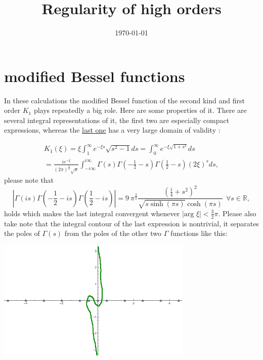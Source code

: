\documentclass[a4paper,11pt]{article}
\begin{document}
\title{Regularity of high orders}


\date{\today}



\maketitle

\section{modified Bessel functions}

In these calculations the modified Bessel function of the second kind and first order \(K_1\) plays repeatedly a big role. 
Here are some properties of it. There are several integral representations of it, the first two are especially compact expressions, 
whereas the \href{https://dlmf.nist.gov/10.32#E14}{last one} has a very large domain of validity  :

\begin{multline}\label{defK}
K_1(\xi) = \xi \int_1^\infty e^{-\xi s} \sqrt{s^2-1} ds = \int_0^\infty e^{-\xi \sqrt{1+s^2}} ds \\
=\frac{i e^{-\xi}}{(2\pi)^{\frac{3}{2}} \sqrt{x}} \int_{- i \infty}^{i \infty} \Gamma(s) \Gamma\left( - \frac{1}{2} - s\right) \Gamma \left( \frac{1}{2}-s\right) (2\xi)^{s} ds,
\end{multline}
please note that 
\begin{equation}
\left|\Gamma(i s) \Gamma\left( - \frac{1}{2} - i s\right) \Gamma \left( \frac{1}{2}-i s\right)\right| = 9 ~\pi^{\frac{3}{2}} \frac{\left(\frac{1}{4} + s^2\right)^2}{\sqrt{s \sinh (\pi s)} \cosh( \pi s)} ~~ \forall s \in \mathbb{R},
\end{equation}
holds which makes the last integral convergent whenever \(|\text{arg } \xi|<\frac{3}{2}\pi\). Please also take note that the integral contour of the last expression is nontrivial, it separates the poles of \(\Gamma(s)\) from the poles of the other two \(\Gamma\) functions like this:

\includegraphics[width=0.7\textwidth]{GammaPolesContour}
\end{document}
